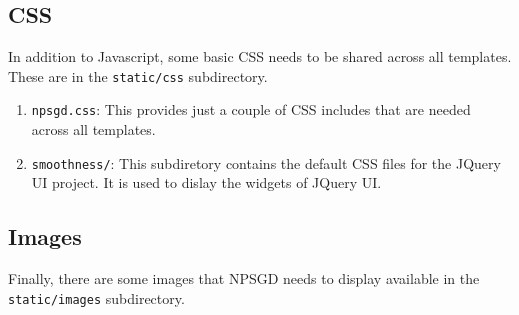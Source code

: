 \documentclass{article}
\newcommand{\mpath}[1]{\texttt{#1}}
\begin{document}
\subsection{CSS}
In addition to Javascript, some basic CSS needs to be shared across all
templates. These are in the \mpath{static/css} subdirectory.
\begin{enumerate}
    \item \texttt{npsgd.css}: This provides just a couple of CSS includes that
    are needed across all templates.
    \item \texttt{smoothness/}: This subdiretory contains the default CSS files
    for the JQuery UI project. It is used to dislay the widgets of JQuery UI.
\end{enumerate}

\subsection{Images}
Finally, there are some images that NPSGD needs to display available in the
\mpath{static/images} subdirectory. 
\end{document}

